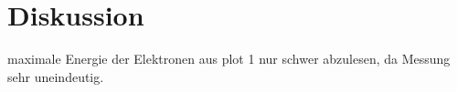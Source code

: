 \section{Diskussion}
\label{sec:Diskussion}
maximale Energie der Elektronen aus plot 1 nur schwer abzulesen, da Messung sehr uneindeutig.
